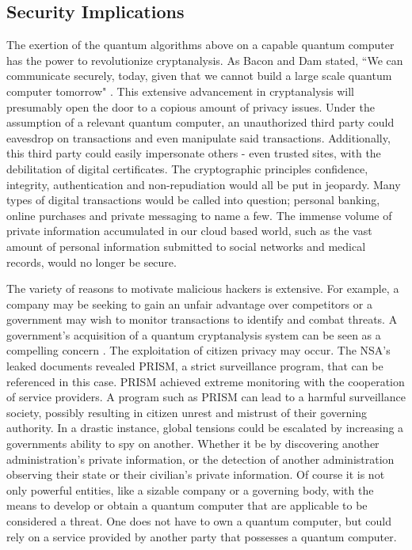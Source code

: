 \subsection{Security Implications}
The exertion of the quantum algorithms above on a capable quantum computer has the power to revolutionize cryptanalysis. As Bacon and Dam stated, ``We can communicate securely, today, given that we cannot build a large scale quantum computer tomorrow" \cite{Q_Alg}. This extensive advancement in cryptanalysis will presumably open the door to a copious amount of privacy issues. Under the assumption of a relevant quantum computer, an unauthorized third party could eavesdrop on transactions and even manipulate said transactions. Additionally, this third party could easily impersonate others - even trusted sites, with the debilitation of digital certificates. The cryptographic principles confidence, integrity, authentication and non-repudiation would all be put in jeopardy. Many types of digital transactions would be called into question; personal banking, online purchases and private messaging to name a few. The immense volume of private information accumulated in our cloud based world, such as the vast amount of personal information submitted to social networks and medical records, would no longer be secure. 

The variety of reasons to motivate malicious hackers is extensive. For example, a company may be seeking to gain an unfair advantage over competitors or a government may wish to monitor transactions to identify and combat threats. A government's acquisition of a quantum cryptanalysis system can be seen as a compelling concern \cite{Sec_Risk}. The exploitation of citizen privacy may occur. The NSA's leaked documents revealed PRISM, a strict surveillance program, that can be referenced in this case. PRISM achieved extreme monitoring with the cooperation of service providers. A program such as PRISM can lead to a harmful surveillance society, possibly resulting in citizen unrest and mistrust of their governing authority. In a drastic instance, global tensions could be escalated by increasing a governments ability to spy on another. Whether it be by discovering another administration's private information, or the detection of another administration observing their state or their civilian's private information. 
Of course it is not only powerful entities, like a sizable company or a governing body, with the means to develop or obtain a quantum computer that are applicable to be considered a threat. One does not have to own a quantum computer, but could rely on a service provided by another party that possesses a quantum computer. 
